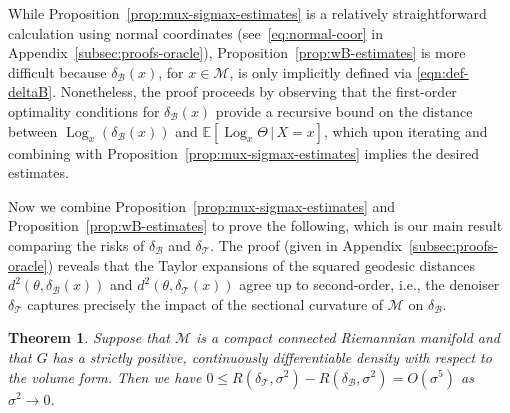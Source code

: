 \documentclass[preprint]{imsart}
\theoremstyle{plain}
\newtheorem{theorem}{Theorem}[section]
\theoremstyle{definition}
\newcommand{\Ebb}{\mathbb{E}}
\newcommand{\Mcal}{\mathcal{M}}
\newcommand{\B}{\mathcal{B}}
\newcommand{\T}{\mathcal{T}}
\DeclareMathOperator{\Log}{Log}
\begin{document}
    While Proposition~\ref{prop:mux-sigmax-estimates} is a relatively straightforward calculation using normal coordinates (see~\eqref{eq:normal-coor} in Appendix~\ref{subsec:proofs-oracle}), Proposition~\ref{prop:wB-estimates} is more difficult because $\delta_{\B}(x)$, for $x\in\Mcal$, is only implicitly defined via \eqref{eqn:def-deltaB}.
    Nonetheless, the proof proceeds by observing that the first-order optimality conditions for $\delta_{\B}(x)$ provide a recursive bound on the distance between $\Log_x(\delta_{\B}(x))$ and $\Ebb[\Log_x\Theta\,|\,X=x]$, which upon iterating and combining with Proposition~\ref{prop:mux-sigmax-estimates} implies the desired estimates.

Now we combine Proposition~\ref{prop:mux-sigmax-estimates} and Proposition~\ref{prop:wB-estimates} to prove the following, which is our main result comparing the risks of $\delta_{\B}$ and $\delta_{\T}$.
The proof (given in Appendix~\ref{subsec:proofs-oracle}) reveals that the Taylor expansions of the squared geodesic distances $d^2(\theta,\delta_{\B}(x))$ and $d^2(\theta,\delta_{\T}(x))$ agree up to second-order, i.e., the denoiser $\delta_{\T}$ captures precisely the impact of the sectional curvature of $\Mcal$ on $\delta_{\B}$.

\begin{theorem}
\label{thm:uncond-main}
Suppose that $\Mcal$ is a compact connected Riemannian manifold and that $G$ has a strictly positive, continuously differentiable density with respect to the volume form. Then we have $0 \le R(\delta_{\T},\sigma^2) - R(\delta_{\B},\sigma^2) = O(\sigma^5)$ as $\sigma^2\to 0$.
\end{theorem}

\iffalse
\end{document}
